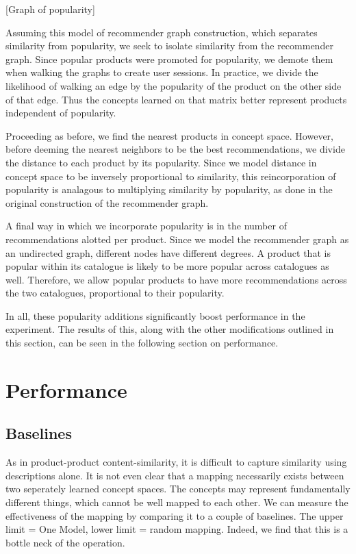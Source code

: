 \documentclass[11pt]{article}
\begin{document}
[Graph of popularity]

Assuming this model of recommender graph construction, which separates similarity
from popularity, we seek to isolate similarity from the recommender graph. Since
popular products were promoted for popularity, we demote them when walking the
graphs to create user sessions. In practice, we divide the likelihood of walking
an edge by the popularity of the product on the other side of that edge. Thus
the concepts learned on that matrix better represent products independent of
popularity. 

Proceeding as before, we find the nearest products in concept space. However,
before deeming the nearest neighbors to be the best recommendations, we divide
the distance to each product by its popularity. Since we model distance in 
concept space to be inversely proportional to similarity, this reincorporation
of popularity is analagous to multiplying similarity by popularity, as done in
the original construction of the recommender graph.

A final way in which we incorporate popularity is in the number of
recommendations alotted per product. Since we model the recommender graph as an
undirected graph, different nodes have different degrees. A product that is
popular within its catalogue is likely to be more popular across catalogues as
well. Therefore, we allow popular products to have more recommendations across
the two catalogues, proportional to their popularity.

In all, these popularity additions significantly boost performance in the
experiment. The results of this, along with the other modifications outlined in
this section, can be seen in the following section on performance.

\section*{Performance}
\subsection*{Baselines}
As in product-product content-similarity, it is difficult to capture similarity using
descriptions alone. It is not even clear that a mapping necessarily exists
between two seperately learned concept spaces. The concepts may represent
fundamentally different things, which cannot be well mapped to each other. We
can measure the effectiveness of the mapping by comparing it to a couple of
baselines. The upper limit = One Model, lower limit = random mapping.
Indeed, we find that this is a bottle neck of the operation.
\end{document}
